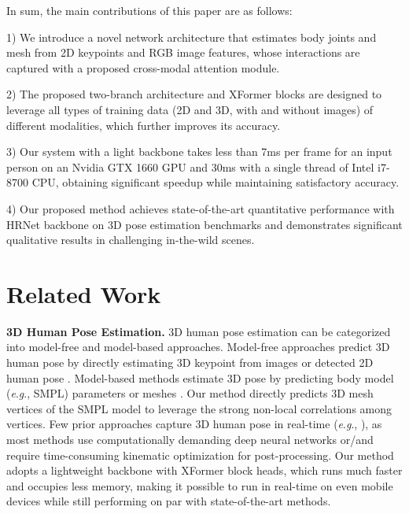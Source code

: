 \documentclass{article}
\newcommand{\eg}{\textit{e}.\textit{g}.}
\newcommand\mypara[1]{\noindent\textbf{#1}}
\begin{document}
In sum, the main contributions of this paper are as follows:

1) We introduce a novel network architecture that estimates body joints and mesh from 2D keypoints and RGB image features, whose interactions are captured with a proposed cross-modal attention module.

2) The proposed two-branch architecture and XFormer blocks are designed to leverage all types of training data (2D and 3D, with and without images) of different modalities, which further improves its accuracy.

3) Our system with a light backbone takes less than 7ms per frame for an input person on an Nvidia GTX 1660 GPU and 30ms with a single thread of Intel i7-8700 CPU, obtaining significant speedup while maintaining satisfactory accuracy. 

4) Our proposed method achieves state-of-the-art quantitative performance with HRNet backbone on 3D pose estimation benchmarks and demonstrates significant qualitative results in challenging in-the-wild scenes.



\section{Related Work}
\label{sec:related}

\mypara{3D Human Pose Estimation.}
3D human pose estimation can be categorized into model-free and model-based approaches.
Model-free approaches predict 3D human pose by directly estimating 3D keypoint from images \cite{pavlakos2018ordinal,lin2020end} or detected 2D human pose \cite{choi2020pose2mesh}.
Model-based methods estimate 3D pose by predicting body model (\eg, SMPL) parameters \cite{kanazawa2018endtoend,kocabas2019vibe,zanfir2021thundr} or meshes \cite{lin2020end,lin2021-mesh-graphormer}.
Our method directly predicts 3D mesh vertices of the SMPL model to leverage the strong non-local correlations among vertices.
Few prior approaches capture 3D human pose in real-time (\eg, \cite{VNect_SIGGRAPH2017,sun2021monocular}), as most methods use computationally demanding deep neural networks or/and require time-consuming kinematic optimization for post-processing.
Our method adopts a lightweight backbone with XFormer block heads, which runs much faster and occupies less memory, making it possible to run in real-time on even mobile devices while still performing on par with state-of-the-art methods.
\end{document}

